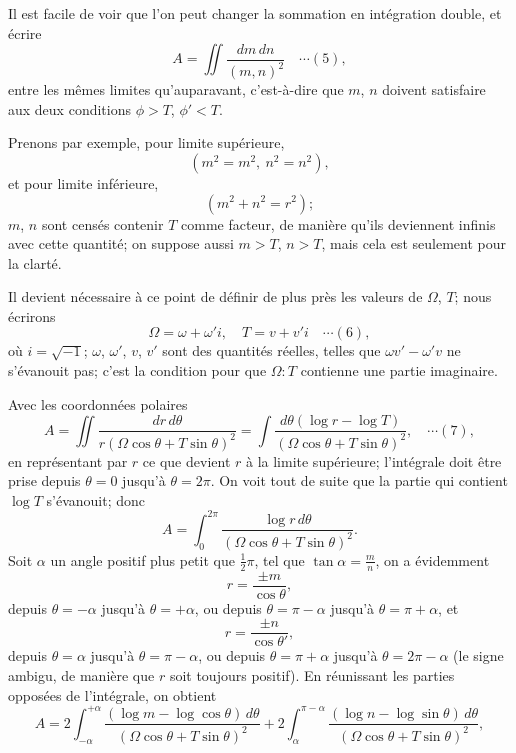 \documentclass[12pt,a4paper]{article}
\begin{document}
\newpage
\setcounter{page}{159}

Il est facile de voir que l'on peut changer la sommation en int\'egration double, et \'ecrire
\[
A = \iint\frac{dm\,dn}{(m,n)^2} \quad\cdots(5),
\]
entre les m\^emes limites qu'auparavant, c'est-\`a-dire que $m$, $n$ doivent satisfaire aux deux conditions $\phi > T$, $\phi' < T$.

Prenons par exemple, pour limite sup\'erieure,
\[
(m^2 = m^2,\ n^2 = n^2),
\]
et pour limite inf\'erieure,
\[
(m^2 + n^2 = r^2);
\]
$m$, $n$ sont cens\'es contenir $T$ comme facteur, de mani\`ere qu'ils deviennent infinis avec cette quantit\'e; on suppose aussi $m > T$, $n > T$, mais cela est seulement pour la clart\'e.

Il devient n\'ecessaire \`a ce point de d\'efinir de plus pr\`es les valeurs de $\Omega$, $T$; nous \'ecrirons
\[
\Omega = \omega + \omega' i,\quad T = v + v' i \quad\cdots(6),
\]
o\`u $i = \sqrt{-1}$; $\omega$, $\omega'$, $v$, $v'$ sont des quantit\'es r\'eelles, telles que $\omega v' - \omega' v$ ne s'\'evanouit pas; c'est la condition pour que $\Omega : T$ contienne une partie imaginaire.

Avec les coordonn\'ees polaires
\[
A = \iint\frac{dr\,d\theta}{r(\Omega\cos\theta + T\sin\theta)^2} = \int\frac{d\theta(\log r - \log T)}{(\Omega\cos\theta + T\sin\theta)^2}, \quad\cdots(7),
\]
en repr\'esentant par $r$ ce que devient $r$ \`a la limite sup\'erieure; l'int\'egrale doit \^etre prise depuis $\theta = 0$ jusqu'\`a $\theta = 2\pi$. On voit tout de suite que la partie qui contient $\log T$ s'\'evanouit; donc
\[
A = \int_0^{2\pi}\frac{\log r\,d\theta}{(\Omega\cos\theta + T\sin\theta)^2}.
\]
Soit $\alpha$ un angle positif plus petit que $\tfrac{1}{2}\pi$, tel que $\tan\alpha = \tfrac{m}{n}$, on a \'evidemment
\[
r = \frac{\pm m}{\cos\theta},
\]
depuis $\theta = -\alpha$ jusqu'\`a $\theta = +\alpha$, ou depuis $\theta = \pi - \alpha$ jusqu'\`a $\theta = \pi + \alpha$, et
\[
r = \frac{\pm n}{\cos\theta'},
\]
depuis $\theta = \alpha$ jusqu'\`a $\theta = \pi - \alpha$, ou depuis $\theta = \pi + \alpha$ jusqu'\`a $\theta = 2\pi - \alpha$ (le signe ambigu, de mani\`ere que $r$ soit toujours positif). En r\'eunissant les parties oppos\'ees de l'int\'egrale, on obtient
\[
A = 2\int_{-\alpha}^{+\alpha}\frac{(\log m - \log\cos\theta)\,d\theta}{(\Omega\cos\theta + T\sin\theta)^2} + 2\int_{\alpha}^{\pi-\alpha}\frac{(\log n - \log\sin\theta)\,d\theta}{(\Omega\cos\theta + T\sin\theta)^2},
\]
\end{document}
